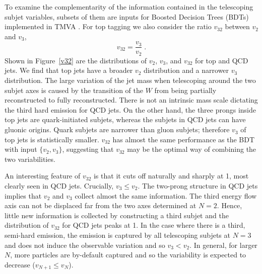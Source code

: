 \documentclass[aps,prl,floatfix,preprintnumbers,twocolumn,groupedaddress,nofootinbib]{revtex4-1}
\newcommand{\be}{\begin{equation}}
\newcommand{\ee}{\end{equation}}
\begin{document}
To examine the complementarity of the information contained in the telescoping subjet variables, subsets of them are inputs for Boosted Decision Trees (BDTs) implemented in \textsc{TMVA} \cite{Hocker:2007ht}. For top tagging we also consider the ratio $v_{32}$ between $v_2$ and $v_3$,
\be
    v_{32}=\frac{v_3}{v_2}\;.
\ee
Shown in Figure~\ref{v32} are the distributions of $v_2$, $v_3$, and $v_{32}$ for top and QCD jets. We find that top jets have a broader $v_2$ distribution and a narrower $v_3$ distribution. The large variation of the jet mass when telescoping around the two subjet axes is caused by the transition of the $W$ from being partially reconstructed to fully reconstructed. There is not an intrinsic mass scale dictating the third hard emission for QCD jets. On the other hand, the three prongs inside top jets are quark-initiated subjets, whereas the subjets in QCD jets can have gluonic origins. Quark subjets are narrower than gluon subjets; therefore $v_3$ of top jets is statistically smaller. $v_{32}$ has almost the same performance as the BDT with input $\{v_2,v_3\}$, suggesting that $v_{32}$ may be the optimal way of combining the two variabilities.

An interesting feature of $v_{32}$ is that it cuts off naturally and sharply at 1, most clearly seen in QCD jets. Crucially, $v_{3} \leq v_{2}$. The two-prong structure in QCD jets implies that $v_{2}$ and $v_{3}$ collect almost the same information. The third energy flow axis can not be displaced far from the two axes determined at $N=2$. Hence, little new information is collected by constructing a third subjet and the distribution of $v_{32}$ for QCD jets peaks at 1. In the case where there is a third, semi-hard emission, the emission is captured by all telescoping subjets at $N=3$ and does not induce the observable variation and so $v_{3} < v_{2}$. In general, for larger $N$, more particles are by-default captured and so the variability is expected to decrease ($v_{N+1}\leq v_{N}$).
\end{document}
